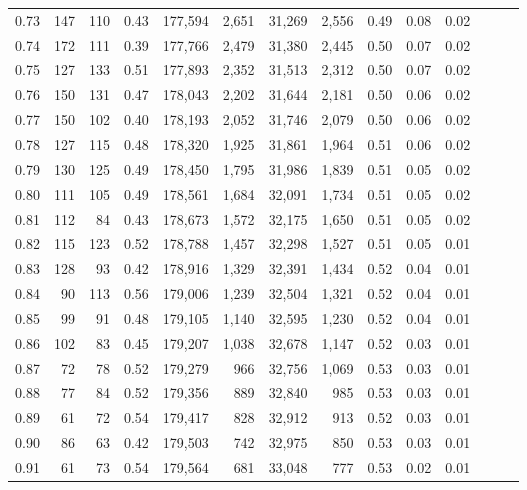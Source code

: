 \begin{tabular}{rrrrrrrrrrrrrr}
0.73 &    147 &  110 &  0.43 &  177,594 &    2,651 &  31,269 &   2,556 &  0.49 &  0.08 &      0.02 \\
0.74 &    172 &  111 &  0.39 &  177,766 &    2,479 &  31,380 &   2,445 &  0.50 &  0.07 &      0.02 \\
0.75 &    127 &  133 &  0.51 &  177,893 &    2,352 &  31,513 &   2,312 &  0.50 &  0.07 &      0.02 \\
0.76 &    150 &  131 &  0.47 &  178,043 &    2,202 &  31,644 &   2,181 &  0.50 &  0.06 &      0.02 \\
0.77 &    150 &  102 &  0.40 &  178,193 &    2,052 &  31,746 &   2,079 &  0.50 &  0.06 &      0.02 \\
0.78 &    127 &  115 &  0.48 &  178,320 &    1,925 &  31,861 &   1,964 &  0.51 &  0.06 &      0.02 \\
0.79 &    130 &  125 &  0.49 &  178,450 &    1,795 &  31,986 &   1,839 &  0.51 &  0.05 &      0.02 \\
0.80 &    111 &  105 &  0.49 &  178,561 &    1,684 &  32,091 &   1,734 &  0.51 &  0.05 &      0.02 \\
0.81 &    112 &   84 &  0.43 &  178,673 &    1,572 &  32,175 &   1,650 &  0.51 &  0.05 &      0.02 \\
0.82 &    115 &  123 &  0.52 &  178,788 &    1,457 &  32,298 &   1,527 &  0.51 &  0.05 &      0.01 \\
0.83 &    128 &   93 &  0.42 &  178,916 &    1,329 &  32,391 &   1,434 &  0.52 &  0.04 &      0.01 \\
0.84 &     90 &  113 &  0.56 &  179,006 &    1,239 &  32,504 &   1,321 &  0.52 &  0.04 &      0.01 \\
0.85 &     99 &   91 &  0.48 &  179,105 &    1,140 &  32,595 &   1,230 &  0.52 &  0.04 &      0.01 \\
0.86 &    102 &   83 &  0.45 &  179,207 &    1,038 &  32,678 &   1,147 &  0.52 &  0.03 &      0.01 \\
0.87 &     72 &   78 &  0.52 &  179,279 &      966 &  32,756 &   1,069 &  0.53 &  0.03 &      0.01 \\
0.88 &     77 &   84 &  0.52 &  179,356 &      889 &  32,840 &     985 &  0.53 &  0.03 &      0.01 \\
0.89 &     61 &   72 &  0.54 &  179,417 &      828 &  32,912 &     913 &  0.52 &  0.03 &      0.01 \\
0.90 &     86 &   63 &  0.42 &  179,503 &      742 &  32,975 &     850 &  0.53 &  0.03 &      0.01 \\
0.91 &     61 &   73 &  0.54 &  179,564 &      681 &  33,048 &     777 &  0.53 &  0.02 &      0.01 \\

\end{tabular}
